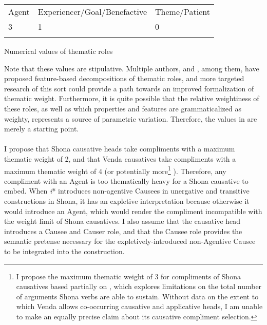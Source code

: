 \documentclass[output=paper,modfonts,nonflat]{langsci/langscibook}
\begin{document}
\tablefirsthead{}

\tabletail{}
\tablelasttail{}
\begin{tabularx}{\textwidth}{XXX}
\lsptoprule
 Agent & Experiencer/Goal/Benefactive & Theme/Patient\\
 3 & 1 & 0\\
\lspbottomrule
\end{tabularx}
\begin{styleDefault}%
\begin{table}
\caption{Numerical values of thematic roles}
\label{tab:1}
\end{table}\end{styleDefault}

\begin{styleDefault}
Note that these values are stipulative. Multiple authors, \citet{Wunderlich1997} and \citet{Mylne1999}, among them, have proposed feature-based decompositions of thematic roles, and more targeted research of this sort could provide a path towards an improved formalization of thematic weight. Furthermore, it is quite possible that the relative weightiness of these roles, as well as which properties and features are grammaticalized as weighty, represents a source of parametric variation. Therefore, the values in  are merely a starting point.\\
\\
I propose that Shona causative heads take compliments with a maximum thematic weight of 2, and that Venda causatives take compliments with a maximum thematic weight of 4 (or potentially more\footnote{I propose the maximum thematic weight of 3 for compliments of Shona causatives based partially on \citet{Wechsler2014}, which explores limitations on the total number of arguments Shona verbs are able to sustain. Without data on the extent to which Venda allows co-occurring causative and applicative heads, I am unable to make an equally precise claim about its causative compliment selection.} ). Therefore, any compliment with an Agent is too thematically heavy for a Shona causative to embed. When \textit{i}* introduces non-agentive Causees in unergative and transitive constructions in Shona, it has an expletive interpretation because otherwise it would introduce an Agent, which would render the compliment incompatible with the weight limit of Shona causatives. I also assume that the causative head introduces a Causee and Causer role, and that the Causee role provides the semantic pretense necessary for the expletively-introduced non-Agentive Causee to be integrated into the construction. 
\end{styleDefault}
\end{document}
